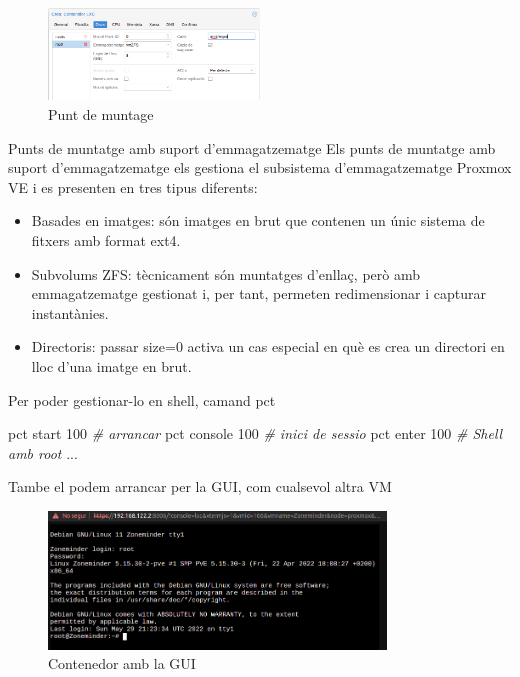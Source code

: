 \documentclass[
  10pt,
]{krantz}
\newenvironment{Shaded}{\begin{snugshade}}{\end{snugshade}}
\newcommand{\CommentTok}[1]{\textcolor[rgb]{0.56,0.35,0.01}{\textit{#1}}}
\newcommand{\ExtensionTok}[1]{#1}
\newcommand{\NormalTok}[1]{#1}
\begin{document}
\begin{figure}
\centering
\includegraphics[width=0.5\textwidth,height=\textheight]{imatges/proxmox/mntEspai.png}
\caption{Punt de muntage}
\end{figure}

Punts de muntatge amb suport d'emmagatzematge Els punts de muntatge amb suport d'emmagatzematge els gestiona el subsistema d'emmagatzematge Proxmox VE i es presenten en tres tipus diferents:

\begin{itemize}
\item
  Basades en imatges: són imatges en brut que contenen un únic sistema de fitxers amb format ext4.
\item
  Subvolums ZFS: tècnicament són muntatges d'enllaç, però amb emmagatzematge gestionat i, per tant, permeten redimensionar i capturar instantànies.
\item
  Directoris: passar size=0 activa un cas especial en què es crea un directori en lloc d'una imatge en brut.
\end{itemize}

Per poder gestionar-lo en shell, camand pct

\begin{Shaded}
\begin{Highlighting}[]
\ExtensionTok{pct}\NormalTok{ start 100  }\CommentTok{\# arrancar}
\ExtensionTok{pct}\NormalTok{ console 100 }\CommentTok{\# inici de sessio}
\ExtensionTok{pct}\NormalTok{ enter 100 }\CommentTok{\# Shell amb root}
\ExtensionTok{...}
\end{Highlighting}
\end{Shaded}

Tambe el podem arrancar per la GUI, com cualsevol altra VM

\begin{figure}
\centering
\includegraphics[width=0.8\textwidth,height=\textheight]{imatges/proxmox/contenedor_gui.png}
\caption{Contenedor amb la GUI}
\end{figure}
\end{document}
